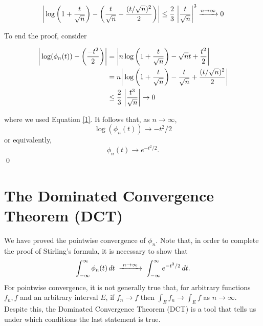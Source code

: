 \documentclass[12pt]{article}
\begin{document}
\begin{equation}
\label{1}
    \bigg|\log\bigg(1+\frac{t}{\sqrt{n}}\bigg)-\bigg(\frac{t}{\sqrt{n}}-\frac{(t/\sqrt{n})^2}{2}\bigg)\bigg|\leq \frac{2}{3}\hspace{1mm}\bigg|\frac{t}{\sqrt{n}}\bigg|^3\xrightarrow{n\to\infty}0
\end{equation}

\vspace{3mm}

\noindent To end the proof, consider 

\begin{align*}
    \bigg|\log(\phi_n(t))-\bigg(\frac{-t^2}{2}\bigg)\bigg|&=\bigg|n\log\bigg(1+\frac{t}{\sqrt{n}}\bigg)-\sqrt{n}t+\frac{t^2}{2}\bigg|\\
    &=n\bigg|\log\bigg(1+\frac{t}{\sqrt{n}}\bigg)-\frac{t}{\sqrt{n}}+\frac{(t/\sqrt{n})^2}{2}\bigg|\\
    &\leq\frac{2}{3}\hspace{1mm}\bigg|\frac{t^3}{\sqrt{n}}\bigg|\to 0
\end{align*}


\noindent where we used Equation \ref{1}. It follows that, as $n\to\infty$, $$\log(\phi_n(t))\to-t^2/2$$ or equivalently, $$\phi_n(t)\to e^{-t^2/2}.$$
\qed

\vspace{4mm}

\section{The Dominated Convergence Theorem (DCT)}

\noindent We have proved the pointwise convergence of $\phi_n$. Note that, in order to complete the proof of Stirling's formula, it is necessary to show that $$\int_{-\infty}^\infty\phi_n(t)\,dt\hspace{1mm}\xrightarrow{\hspace{1mm}n\to\infty\hspace{1mm}}\hspace{1mm}\int_{-\infty}^\infty e^{-t^2/2}\,dt.$$ For pointwise convergence, it is not generally true that, for arbitrary functions $f_n, f$ and an arbitrary interval $E$, if $f_n\to f$ then $\int_E f_n\to \int_E f$ as $n\to\infty$. Despite this, the Dominated Convergence Theorem (DCT) is a tool that tells us under which conditions the last statement is true. 

\vspace{3mm}
\end{document}
